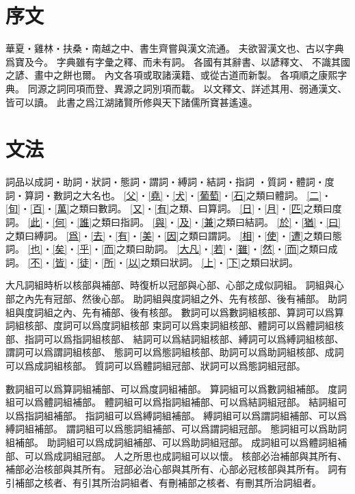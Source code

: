 \chapter*{序文}
華夏・雞林・扶桑・南越之中、書生齊嘗與漢文流通。
夫欲習漢文也、古以字典爲寶及今。
字典雖有字彙之釋、而未有詞。
各國有其辭書、以諺釋文、
不識其國之諺、畫中之餅也爾。
內文各項或取諸漢籍、或從古道而新製。
各項順之康熙字典。
同源之詞同項而登、異源之詞別項而載。
以文釋文、詳述其用、弱通漢文、皆可以讀。
此書之爲江湖諸賢所修與天下諸儒所寶甚遙遠。
\chapter*{文法}
詞品以成詞・助詞・狀詞・態詞・謂詞・縛詞・結詞・指詞
・質詞・體詞・度詞・算詞・數詞之大名也。
\cref{父}・\cref{堯}・\cref{犬}・\cref{葡萄}・\cref{石}之類曰體詞。
\cref{二}・\cref{旬}・\cref{百}・\cref{萬}之類曰數詞。
\cref{又}・\cref{有}之類、曰算詞。
\cref{日}・\cref{月}・\cref{匹}之類曰度詞。
\cref{此}・\cref{何}・\cref{誰}之類曰指詞。
\cref{與}・\cref{及}・\cref{兼}之類曰結詞。
\cref{於}・\cref{猶}・\cref{曰}之類曰縛詞。
\cref{爲}・\cref{去}・\cref{有}・\cref{美}・\cref{因}之類曰謂詞。
\cref{相}・\cref{使}・\cref{遭}之類曰態詞。
\cref{也}・\cref{矣}・\cref{乎}・\cref{而}之類曰助詞。
\cref{大凡}・\cref{若}・\cref{雖}・\cref{然}・\cref{而}之類曰成詞。
\cref{不}・\cref{皆}・\cref{徒}・\cref{所}・\cref{以}之類曰狀詞。
\cref{上}・\cref{下}之類曰狀詞。

大凡詞組時析以核部與補部、時復析以冠部與心部、心部之成似詞組。
詞組與心部之內先有冠部、然後心部。
助詞組與度詞組之外、先有核部、後有補部。
助詞組與度詞組之內、先有補部、後有核部。
數詞可以爲數詞組核部、算詞可以爲算詞組核部、度詞可以爲度詞組核部
束詞可以爲束詞組核部、體詞可以爲體詞組核部、指詞可以爲指詞組核部、
結詞可以爲結詞組核部、縛詞可以爲縛詞組核部、謂詞可以爲謂詞組核部、
態詞可以爲態詞組核部、助詞可以爲助詞組核部、成詞可以爲成詞組核部。
質詞可以爲體詞組冠部、狀詞可以爲態詞組冠部。

數詞組可以爲算詞組補部、可以爲度詞組補部。
算詞組可以爲數詞組補部。
度詞組可以爲體詞組補部。
體詞組可以爲指詞組補部、可以爲結詞組冠部。
結詞組可以爲指詞組補部。
指詞組可以爲縛詞組補部。
縛詞組可以爲謂詞組補部、可以爲縛詞組補部。
謂詞組可以爲態詞組補部、可以爲謂詞組冠部。
態詞組可以爲助詞組補部。
助詞組可以爲成詞組補部、可以爲助詞組冠部。
成詞組可以爲體詞組補部、可以爲成詞組冠部。
人之所思也成詞組可以以懷。
核部必治補部與其所有、補部必治核部與其所有。
冠部必治心部與其所有、心部必冠核部與其所有。
詞有引補部之核者、有引其所治詞組者、有刪補部之核者、有刪其所治詞組者。
